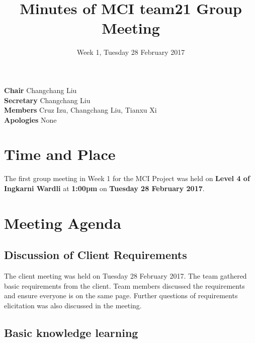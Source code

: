 \documentclass[11pt, a4paper]{article}
\begin{document}
\title{Minutes of MCI team21 Group Meeting}
\date{Week 1, Tuesday 28 February 2017}
\maketitle

\vspace*{15pt}

\begin{center}
\begin{flushleft}
  \textbf{Chair}      \qquad Changchang Liu\\
  \textbf{Secretary}  \qquad Changchang Liu\\
  \textbf{Members}    \qquad Cruz Izu, Changchang Liu, Tianxu Xi\\
  \textbf{Apologies}  \qquad None \\
\end{flushleft}
\end{center}




\vspace*{10pt}

\section{Time and Place}
The first group meeting in Week 1 for the MCI Project was held on \textbf{Level 4 of Ingkarni Wardli} at \textbf{1:00pm} on \textbf{Tuesday 28 February 2017}. \\
 
\section{Meeting Agenda}

\subsection{Discussion of Client Requirements}

The client meeting was held on Tuesday 28 February 2017. The team gathered basic requirements from the client. Team members discussed the requirements and ensure everyone is on the same page. Further questions of requirements elicitation was also discussed in the meeting.\\

\subsection{Basic knowledge learning}
\end{document}
